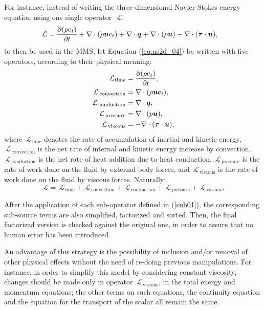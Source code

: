 \documentclass[10pt]{article}
\newcommand{\Diff}[2] {\dfrac{\partial( #1)}{\partial #2}}
\newcommand{\bv}[1]{\ensuremath{\mbox{\boldmath$ #1 $}}}
\newcommand{\Lo}{\,\mathcal{L}}
\newcommand{\convection}{\,\text{convection}}
\newcommand{\conduction}{\,\text{conduction}}
\newcommand{\viscous}{\,\text{viscous}}
\newcommand{\pressure}{\,\text{pressure}}
\begin{document}
For instance, instead of writing the three-dimensional Navier-Stokes energy equation using one single operator~$\Lo$:
\begin{equation}
 \label{eq:ns2d_04}
\begin{split}
\Lo= \Diff{\rho e_t}{t}&+\nabla \cdot (\rho\bv{u}e_t) +\nabla\cdot \bv{q} +  \nabla\cdot(p  \bv{u})  - \nabla \cdot (\bv{\tau} \cdot \bv{u}),
\end{split}
\end{equation}
to then be used in the MMS, let Equation (\ref{eq:ns2d_04}) be written with five operators, according to their physical meaning:
\begin{equation}
 \begin{split}\label{sub01}
  \Lo_{\text{time}}&=\Diff{\rho e_t}{t} ,\\
  \Lo_{\convection}&=\nabla \cdot (\rho\bv{u}e_t),\\
  \Lo_{\conduction}&=\nabla\cdot \bv{q},\\
  \Lo_{\pressure}&= \nabla\cdot(p  \bv{u}),\\
  \Lo_{\viscous}&=- \nabla \cdot (\bv{\tau} \cdot \bv{u}),
 \end{split}
\end{equation}
where $\Lo_{\text{time}}$ denotes the rate of accumulation of inertial and kinetic energy, $\Lo_{\convection}$ is the net rate of internal and kinetic energy increase by convection, $\Lo_{\conduction}$ is the net rate of heat addition due to heat conduction, $\Lo_{\pressure}$ is the rate of work done on the fluid by external body forces, and $\Lo_{\viscous}$ is the rate of work done on the fluid by viscous forces. Naturally:
$$\Lo=\Lo_{\text{time}}+\Lo_{\convection}+\Lo_{\conduction}+\Lo_{\pressure}+\Lo_{\viscous}.$$

After the application of each sub-operator defined in (\ref{sub01}), the corresponding sub-source terms are also simplified, factorized and sorted. Then, the final factorized version is checked against the original one, in order to assure that no human error has been introduced.

An advantage of this strategy is the possibility of inclusion and/or removal of other physical effects without the need of re-doing previous manipulations. For instance, in order to simplify this model by considering constant viscosity, changes should be made only in operator  $\Lo_{\viscous}$, in the total energy and momentum equations; the other terms on such equations, the continuity equation and the equation for the transport of the scalar all remain the same. 
\end{document}

